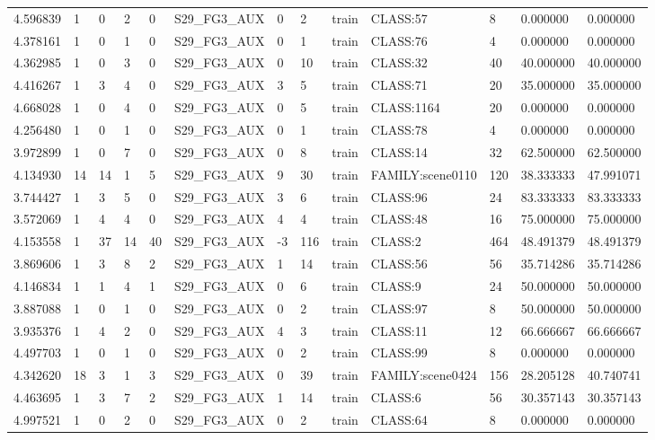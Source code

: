 \begin{tabular}{lllllllllllll}
4.596839 & 1 & 0 & 2 & 0 & S29\_FG3\_AUX & 0 & 2 & train & CLASS:57 & 8 & 0.000000 & 0.000000 \\
4.378161 & 1 & 0 & 1 & 0 & S29\_FG3\_AUX & 0 & 1 & train & CLASS:76 & 4 & 0.000000 & 0.000000 \\
4.362985 & 1 & 0 & 3 & 0 & S29\_FG3\_AUX & 0 & 10 & train & CLASS:32 & 40 & 40.000000 & 40.000000 \\
4.416267 & 1 & 3 & 4 & 0 & S29\_FG3\_AUX & 3 & 5 & train & CLASS:71 & 20 & 35.000000 & 35.000000 \\
4.668028 & 1 & 0 & 4 & 0 & S29\_FG3\_AUX & 0 & 5 & train & CLASS:1164 & 20 & 0.000000 & 0.000000 \\
4.256480 & 1 & 0 & 1 & 0 & S29\_FG3\_AUX & 0 & 1 & train & CLASS:78 & 4 & 0.000000 & 0.000000 \\
3.972899 & 1 & 0 & 7 & 0 & S29\_FG3\_AUX & 0 & 8 & train & CLASS:14 & 32 & 62.500000 & 62.500000 \\
4.134930 & 14 & 14 & 1 & 5 & S29\_FG3\_AUX & 9 & 30 & train & FAMILY:scene0110 & 120 & 38.333333 & 47.991071 \\
3.744427 & 1 & 3 & 5 & 0 & S29\_FG3\_AUX & 3 & 6 & train & CLASS:96 & 24 & 83.333333 & 83.333333 \\
3.572069 & 1 & 4 & 4 & 0 & S29\_FG3\_AUX & 4 & 4 & train & CLASS:48 & 16 & 75.000000 & 75.000000 \\
4.153558 & 1 & 37 & 14 & 40 & S29\_FG3\_AUX & -3 & 116 & train & CLASS:2 & 464 & 48.491379 & 48.491379 \\
3.869606 & 1 & 3 & 8 & 2 & S29\_FG3\_AUX & 1 & 14 & train & CLASS:56 & 56 & 35.714286 & 35.714286 \\
4.146834 & 1 & 1 & 4 & 1 & S29\_FG3\_AUX & 0 & 6 & train & CLASS:9 & 24 & 50.000000 & 50.000000 \\
3.887088 & 1 & 0 & 1 & 0 & S29\_FG3\_AUX & 0 & 2 & train & CLASS:97 & 8 & 50.000000 & 50.000000 \\
3.935376 & 1 & 4 & 2 & 0 & S29\_FG3\_AUX & 4 & 3 & train & CLASS:11 & 12 & 66.666667 & 66.666667 \\
4.497703 & 1 & 0 & 1 & 0 & S29\_FG3\_AUX & 0 & 2 & train & CLASS:99 & 8 & 0.000000 & 0.000000 \\
4.342620 & 18 & 3 & 1 & 3 & S29\_FG3\_AUX & 0 & 39 & train & FAMILY:scene0424 & 156 & 28.205128 & 40.740741 \\
4.463695 & 1 & 3 & 7 & 2 & S29\_FG3\_AUX & 1 & 14 & train & CLASS:6 & 56 & 30.357143 & 30.357143 \\
4.997521 & 1 & 0 & 2 & 0 & S29\_FG3\_AUX & 0 & 2 & train & CLASS:64 & 8 & 0.000000 & 0.000000 \\

\end{tabular}
